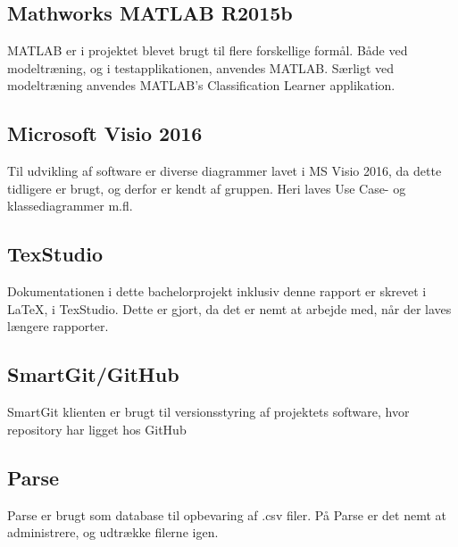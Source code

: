 \subsection*{Mathworks MATLAB R2015b}
MATLAB er i projektet blevet brugt til flere forskellige formål. Både ved modeltræning, og i testapplikationen, anvendes MATLAB. Særligt ved modeltræning anvendes MATLAB's Classification Learner applikation.

\subsection*{Microsoft Visio 2016}

Til udvikling af software er diverse diagrammer lavet i MS Visio 2016, da dette tidligere er brugt, og derfor er kendt af gruppen. Heri laves Use Case- og klassediagrammer m.fl.

\subsection*{TexStudio}
Dokumentationen i dette bachelorprojekt inklusiv denne rapport er skrevet i \LaTeX, i TexStudio. Dette er gjort, da det er nemt at arbejde med, når der laves længere rapporter.

\subsection*{SmartGit/GitHub}
SmartGit klienten\citep{smartgit} er brugt til versionsstyring af projektets software, hvor repository har ligget hos GitHub\citep{github}

\subsection*{Parse}
Parse \citep{RefWorks:11} er brugt som database til opbevaring af .csv filer. På Parse er det nemt at administrere, og udtrække filerne igen.